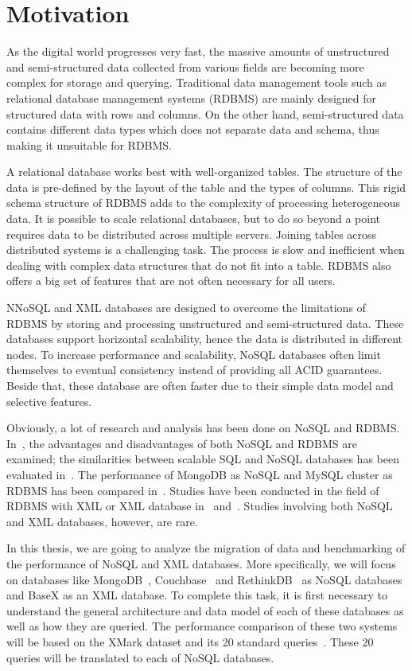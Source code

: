 \documentclass[a4paper,12pt]{book}
\begin{document}
		\section{Motivation}
		\label{motivation}
		    As the digital world progresses very fast, the massive amounts of unstructured and semi-structured data collected from various fields are becoming more complex for storage and querying. Traditional data management tools such as relational database management systems (RDBMS) are mainly designed for structured data with rows and columns. On the other hand, semi-structured data contains different data types which does not separate data and schema, thus making it unsuitable for RDBMS.
\par		
A relational database works best with well-organized tables. The structure of the data is pre-defined by the layout of the table and the types of columns. This rigid schema structure of RDBMS adds to the complexity of processing heterogeneous data. It is possible to scale relational databases, but to do so beyond a point requires data to be distributed across multiple servers. Joining tables across distributed systems is a challenging task. The process is slow and inefficient when dealing with complex data structures that do not fit into a table. RDBMS also offers a big set of features that are not often necessary for all users.
\par
NNoSQL and XML databases are designed to overcome the limitations of RDBMS by storing and processing unstructured and semi-structured data. These databases support horizontal scalability, hence the data is distributed in different nodes. To increase performance and scalability, NoSQL databases often limit themselves to eventual consistency instead of providing all ACID guarantees. Beside that, these database are often faster due to their simple data model and selective features.
\par		
Obviously, a lot of research and analysis has been done on NoSQL and RDBMS. In~\cite{nance2013nosql}, the advantages and disadvantages of both NoSQL and RDBMS are examined; the similarities between scalable SQL and NoSQL databases has been evaluated in~\cite{cattell2011scalable}. The performance of MongoDB as NoSQL and MySQL cluster as RDBMS has been compared in~\cite{hadjigeorgiou2013rdbms}. Studies have been conducted in the field of RDBMS with XML or XML database in~\cite{jiang2002xparent} and~\cite{shanmugasundaram1999relational}. Studies involving both NoSQL and XML databases, however, are rare.
\par
In this thesis, we are going to analyze the migration of data and benchmarking of the performance of NoSQL and XML databases. More specifically, we will focus on databases like MongoDB~\cite{mongodb:org}, Couchbase~\cite{couchbase} and RethinkDB~\cite{rethinkdb}  as NoSQL databases and BaseX as an XML database. To complete this task, it is first necessary to understand the general architecture and data model of each of these databases as well as how they are queried. The performance comparison of these two systems will be based on the XMark dataset and its 20 standard queries~\citep{xmark/original}. These 20 queries will be translated to each of NoSQL databases.
\end{document}
